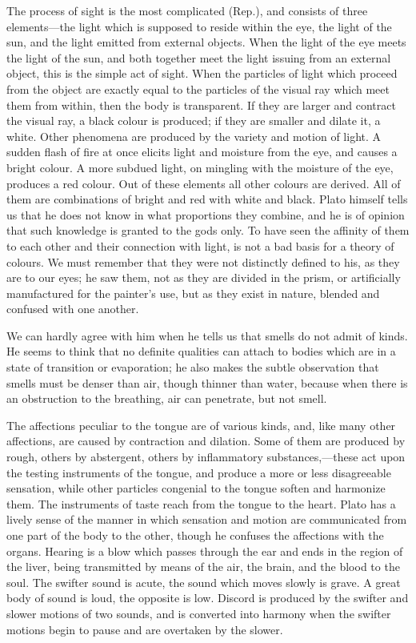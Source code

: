 The process of sight is the most complicated (Rep.), and consists of three
elements—the light which is supposed to reside within the eye, the
light of the sun, and the light emitted from external objects. When the
light of the eye meets the light of the sun, and both together meet the
light issuing from an external object, this is the simple act of sight.
When the particles of light which proceed from the object are exactly
equal to the particles of the visual ray which meet them from within, then
the body is transparent. If they are larger and contract the visual ray, a
black colour is produced; if they are smaller and dilate it, a white.
Other phenomena are produced by the variety and motion of light. A sudden
flash of fire at once elicits light and moisture from the eye, and causes
a bright colour. A more subdued light, on mingling with the moisture of
the eye, produces a red colour. Out of these elements all other colours
are derived. All of them are combinations of bright and red with white and
black. Plato himself tells us that he does not know in what proportions
they combine, and he is of opinion that such knowledge is granted to the
gods only. To have seen the affinity of them to each other and their
connection with light, is not a bad basis for a theory of colours. We must
remember that they were not distinctly defined to his, as they are to our
eyes; he saw them, not as they are divided in the prism, or artificially
manufactured for the painter’s use, but as they exist in nature, blended
and confused with one another.

We can hardly agree with him when he tells us that smells do not admit of
kinds. He seems to think that no definite qualities can attach to bodies
which are in a state of transition or evaporation; he also makes the
subtle observation that smells must be denser than air, though thinner
than water, because when there is an obstruction to the breathing, air can
penetrate, but not smell.

The affections peculiar to the tongue are of various kinds, and, like many
other affections, are caused by contraction and dilation. Some of them are
produced by rough, others by abstergent, others by inflammatory
substances,—these act upon the testing instruments of the tongue,
and produce a more or less disagreeable sensation, while other particles
congenial to the tongue soften and harmonize them. The instruments of
taste reach from the tongue to the heart. Plato has a lively sense of the
manner in which sensation and motion are communicated from one part of the
body to the other, though he confuses the affections with the organs.
Hearing is a blow which passes through the ear and ends in the region of
the liver, being transmitted by means of the air, the brain, and the blood
to the soul. The swifter sound is acute, the sound which moves slowly is
grave. A great body of sound is loud, the opposite is low. Discord is
produced by the swifter and slower motions of two sounds, and is converted
into harmony when the swifter motions begin to pause and are overtaken by
the slower.

